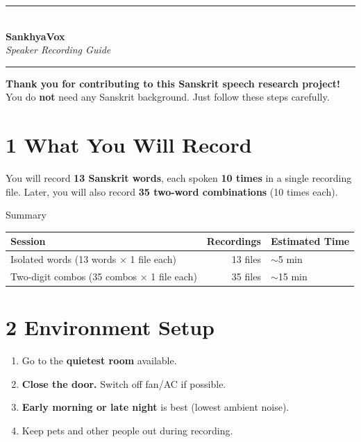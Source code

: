 \documentclass[11pt,a4paper]{article}
\begin{document}
\begin{center}
  {\color{saffron}\rule{\textwidth}{2pt}}\\[0.4cm]
  {\Huge\bfseries\color{deepblue} SankhyaVox}\\[0.2cm]
  {\Large\color{gray}\textit{Speaker Recording Guide}}\\[0.3cm]
  {\color{saffron}\rule{\textwidth}{1pt}}
\end{center}

\vspace{0.5cm}
\noindent
\textbf{Thank you for contributing to this Sanskrit speech research project!}
You do \textbf{not} need any Sanskrit background.
Just follow these steps carefully.

\section*{1 \quad What You Will Record}

You will record \textbf{13 Sanskrit words}, each spoken \textbf{10 times} in a single
recording file.
Later, you will also record \textbf{35 two-word combinations} (10 times each).

\vspace{0.3cm}
\begin{infobox}{Summary}
\begin{tabular}{lrl}
\toprule
\textbf{Session} & \textbf{Recordings} & \textbf{Estimated Time} \\
\midrule
Isolated words (13 words $\times$ 1 file each) & 13 files & $\sim$5 min \\
Two-digit combos (35 combos $\times$ 1 file each) & 35 files & $\sim$15 min \\
\bottomrule
\end{tabular}
\end{infobox}

\section*{2 \quad Environment Setup}

\begin{enumerate}[leftmargin=1.5em, itemsep=4pt]
  \item Go to the \textbf{quietest room} available.
  \item \textbf{Close the door.} Switch off fan/AC if possible.
  \item \textbf{Early morning or late night} is best (lowest ambient noise).
  \item Keep pets and other people out during recording.
\end{enumerate}
\end{document}
